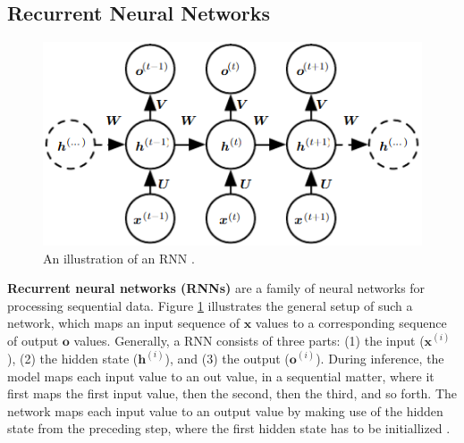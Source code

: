 \documentclass[./main.tex]{subfiles}
\begin{document}
\subsection{Recurrent Neural Networks}
\begin{figure}[htbp]
    \centering
    \includegraphics[width = 0.5 \textwidth]{./entities/rnn_illustration.PNG}
    \caption{An illustration of an RNN \cite{DL_book}.}
    \label{fig:rnn_illustration}
\end{figure}
\noindent \textbf{Recurrent neural networks (RNNs)} are a family of neural networks for processing sequential data. Figure \ref{fig:rnn_illustration} illustrates the general setup of such a network, which maps an input sequence of $\bm{x}$ values to a corresponding sequence of output $\bm{o}$ values. Generally, a RNN consists of three parts: (1) the input ($\bm{x}^{(i)}$), (2) the hidden state ($\bm{h}^{(i)}$), and (3) the output ($\bm{o}^{(i)}$). During inference, the model maps each input value to an out value, in a sequential matter, where it first maps the first input value, then the second, then the third, and so forth. The network maps each input value to an output value by making use of the hidden state from the preceding step, where the first hidden state has to be initiallized \cite{DL_book}.
\end{document}
